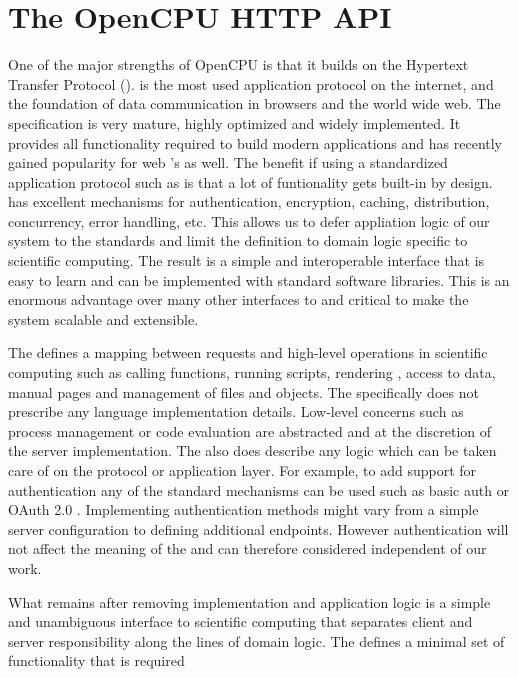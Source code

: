 \section{The OpenCPU HTTP API}

One of the major strengths of OpenCPU is that it builds on the Hypertext Transfer Protocol (\HTTP). \HTTP is the most used application protocol on the internet, and the foundation of data communication in browsers and the world wide web. The \HTTP specification is very mature, highly optimized and widely implemented. It provides all functionality required to build modern applications and has recently gained popularity for web \API's as well. The benefit if using a standardized application protocol such as \HTTP is that a lot of funtionality gets built-in by design. \HTTP has excellent mechanisms for authentication, encryption, caching, distribution, concurrency, error handling, etc. This allows us to defer appliation logic of our system to the \HTTP standards and limit the \OpenCPU \API definition to domain logic specific to scientific computing. The result is a simple and interoperable interface that is easy to learn and can be implemented with standard \HTTP software libraries. This is an enormous advantage over many other interfaces to \R and critical to make the system scalable and extensible. 

The \OpenCPU \API defines a mapping between \HTTP requests and high-level operations in scientific computing such as calling functions, running scripts, rendering \Latex, access to data, manual pages and management of files and objects. The \API specifically does not prescribe any language implementation details. Low-level concerns such as process management or code evaluation are abstracted and at the discretion of the server implementation. The \API also does describe any logic which can be taken care of on the protocol or application layer. For example, to add support for authentication any of the standard mechanisms can be used such as \HTTP basic auth \citep{franks1999rfc} or OAuth 2.0 \citep{hardt2012oauth}. Implementing authentication methods might vary from a simple server configuration to defining additional endpoints. However authentication will not affect the meaning of the \API and can therefore considered independent of our work.

What remains after removing implementation and application logic is a simple and unambiguous interface to scientific computing that separates client and server responsibility along the lines of domain logic. The \OpenCPU \API defines a minimal set of functionality that is required 



